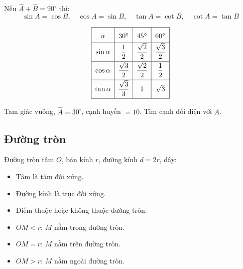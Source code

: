\documentclass[12pt,a4paper]{article}
\begin{document}
\begin{tinhchat}[title={Hai góc phụ nhau}]
  Nếu $\widehat{A} + \widehat{B} = 90^\circ$ thì:
  \[\sin A = \cos B, \quad \cos A = \sin B, \quad \tan A = \cot B, \quad \cot A = \tan B\]
\end{tinhchat}

\begin{congthuc}[title={Góc đặc biệt}]
  \[
  \renewcommand{\arraystretch}{1.8}
  \begin{array}{|c|c|c|c|}
    \hline
    \alpha & 30^\circ & 45^\circ & 60^\circ \\
    \hline
    \sin\alpha & \dfrac{1}{2} & \dfrac{\sqrt{2}}{2} & \dfrac{\sqrt{3}}{2} \\[4pt]
    \hline
    \cos\alpha & \dfrac{\sqrt{3}}{2} & \dfrac{\sqrt{2}}{2} & \dfrac{1}{2} \\[4pt]
    \hline
    \tan\alpha & \dfrac{\sqrt{3}}{3} & 1 & \sqrt{3} \\[4pt]
    \hline
  \end{array}
  \]
\end{congthuc}

\begin{vidu}
  Tam giác vuông, $\widehat{A} = 30^\circ$, cạnh huyền $= 10$. Tìm cạnh đối diện với $A$.
\end{vidu}

\subsection{Đường tròn}

\begin{dinhnghia}
  Đường tròn tâm $O$, bán kính $r$, đường kính $d = 2r$, dây:
  \begin{itemize}
    \item Tâm là tâm đối xứng.
    \item Đường kính là trục đối xứng.
    \item Điểm thuộc hoặc không thuộc đường tròn.
  \end{itemize}
\end{dinhnghia}

\begin{tinhchat}[title={Vị trí tương đối của điểm $M$ với đường tròn $(O;\, r)$}]
  \begin{itemize}
    \item $OM < r$: $M$ nằm trong đường tròn.
    \item $OM = r$: $M$ nằm trên đường tròn.
    \item $OM > r$: $M$ nằm ngoài đường tròn.
  \end{itemize}
\end{tinhchat}
\end{document}

